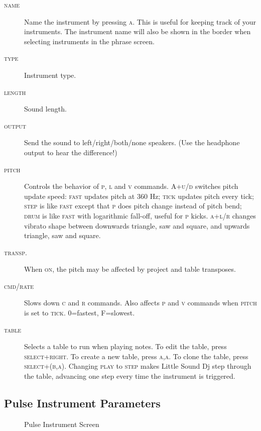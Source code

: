 \begin{description}
	\item[\textsc{name}] Name the instrument by pressing \textsc{a}. This is useful for keeping track of your instruments. The instrument name will also be shown in the border when selecting instruments in the phrase screen.
	\item[\textsc{type}] Instrument type.
	\item[\textsc{length}] Sound length.
	\item[\textsc{output}] Send the sound to left/right/both/none speakers. (Use the headphone output to hear the difference!)
    \item[\textsc{pitch}] Controls the behavior of \textsc{p}, \textsc{l} and \textsc{v} commands. \textsc{A+u/d} switches pitch update speed: \textsc{fast} updates pitch at 360 Hz; \textsc{tick} updates pitch every tick; \textsc{step} is like \textsc{fast} except that \textsc{p} does pitch change instead of pitch bend; \textsc{drum} is like \textsc{fast} with logarithmic fall-off, useful for \textsc{p} kicks. \textsc{a+l/r} changes vibrato shape between downwards triangle, saw and square, and upwards triangle, saw and square.
    \item[\textsc{transp.}] When \textsc{on}, the pitch may be affected by project and table transposes.
    \item[\textsc{cmd/rate}] Slows down \textsc{c} and \textsc{r} commands.
        Also affects \textsc{p} and \textsc{v} commands when \textsc{pitch} is set to \textsc{tick}.
        0=fastest, F=slowest.
    \item[\textsc{table}] Selects a table to run when playing notes. To edit the table, press \textsc{select+right}. To create a new table, press \textsc{a,a}. To clone the table, press \textsc{select+(b,a)}.
        Changing \textsc{play} to \textsc{step} makes Little Sound Dj step through the table, advancing one step every time the instrument is triggered.
\end{description}

\subsection{Pulse Instrument Parameters}
\label{detune}

\begin{figure}[htpb]
	\begin{center}
	\end{center}
	\caption{Pulse Instrument Screen}
	\label{fig:instr-pulse}
\end{figure}

